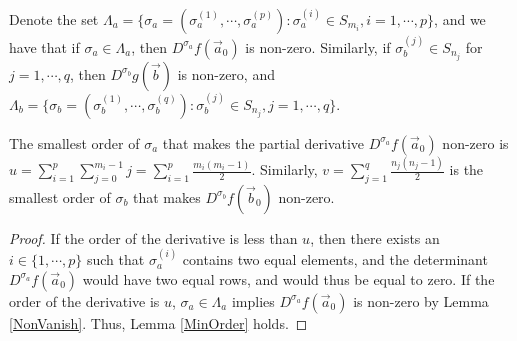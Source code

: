\begin{remark}{\label{DefLambda}}
Denote the set $\Lambda_{a}=\{\sigma_{a}=(\sigma_{a}^{(1)},\cdots,\sigma_{a}^{(p)}):\sigma_{a}^{(i)}\in S_{m_{i}}, i=1,\cdots,p\}$, and we have that if $\sigma_{a}\in \Lambda_{a}$, then $D^{\sigma_{a}}f(\vec{a}_{0})$ is non-zero. Similarly, if $\sigma^{(j)}_{b}\in S_{n_j}$ for $j=1,\cdots,q$, then $D^{\sigma_{b}}g(\vec{b})$ is non-zero, and $\Lambda_{b}=\{\sigma_{b}=(\sigma_{b}^{(1)},\cdots,\sigma_{b}^{(q)}):\sigma_{b}^{(j)}\in S_{n_{j}}, j=1,\cdots,q\}$.
\end{remark}

\begin{lemma}{\label{MinOrder}}
The smallest order of $\sigma_{a}$ that makes the partial derivative $D^{\sigma_{a}}f(\vec{a}_{0})$ non-zero is $u=\sum_{i=1}^{p}\sum_{j=0}^{m_{i}-1}j=\sum_{i=1}^{p}\frac{m_{i}(m_{i}-1)}{2}$. Similarly, $v=\sum_{j=1}^{q}\frac{n_{j}(n_{j}-1)}{2}$ is the smallest order of $\sigma_{b}$ that makes $D^{\sigma_{b}}f(\vec{b}_{0})$ non-zero.
\end{lemma}
\begin{proof}
	If the order of the derivative is less than $u$, then there exists an $i\in\{1,\cdots,p\}$ such that $\sigma_{a}^{(i)}$ contains two equal elements, and the determinant $D^{\sigma_{a}}f(\vec{a}_{0})$ would have two equal rows, and would thus be equal to zero. If the order of the derivative is $u$, $\sigma_{a}\in\Lambda_{a}$ implies $D^{\sigma_{a}}f(\vec{a}_{0})$ is non-zero by Lemma \ref{NonVanish}. Thus, Lemma \ref{MinOrder} holds.
\end{proof}

